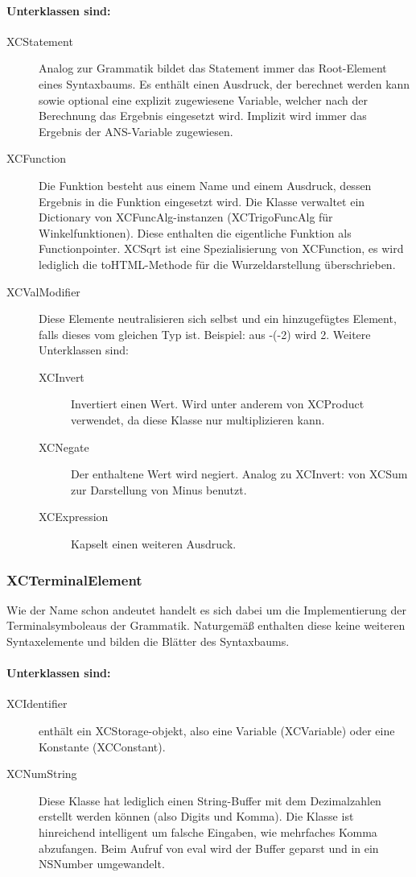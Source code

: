 \paragraph{Unterklassen sind:} 
\begin{description}
	\item[XCStatement]
		Analog zur Grammatik bildet das Statement immer das Root-Element eines Syntaxbaums. Es enthält einen Ausdruck, der berechnet werden kann sowie optional eine explizit zugewiesene Variable, welcher nach der Berechnung das Ergebnis eingesetzt wird. Implizit wird immer das Ergebnis der ANS-Variable zugewiesen. 
	\item[XCFunction] Die Funktion besteht aus einem Name und einem Ausdruck, dessen Ergebnis in die Funktion eingesetzt wird. Die Klasse verwaltet ein Dictionary von XCFuncAlg-instanzen (XCTrigoFuncAlg für Winkelfunktionen). Diese enthalten die eigentliche Funktion als Functionpointer.
		XCSqrt ist eine Spezialisierung von XCFunction, es wird lediglich die toHTML-Methode für die Wurzeldarstellung überschrieben.
	\item[XCValModifier] Diese Elemente neutralisieren sich selbst und ein hinzugefügtes Element, falls dieses vom gleichen Typ ist.
		Beispiel: aus -(-2) wird 2.
		Weitere Unterklassen sind:
		\begin{description}
			\item[XCInvert]
				Invertiert einen Wert. Wird unter anderem von XCProduct verwendet, da diese Klasse nur multiplizieren kann.
			\item[XCNegate] Der enthaltene Wert wird negiert. Analog zu XCInvert: von XCSum zur 
				Darstellung von Minus benutzt.
			\item[XCExpression] Kapselt einen weiteren Ausdruck.
		\end{description}
\end{description}
\subsubsection{XCTerminalElement}
Wie der Name schon andeutet handelt es sich dabei um die Implementierung der Terminalsymboleaus der Grammatik. Naturgemäß enthalten diese keine weiteren Syntaxelemente und bilden die Blätter des Syntaxbaums.

\paragraph{Unterklassen sind:} 
\begin{description}
	\item[XCIdentifier] enthält ein XCStorage-objekt, also eine Variable (XCVariable) oder eine Konstante (XCConstant).
	\item[XCNumString] Diese Klasse hat lediglich einen String-Buffer mit dem Dezimalzahlen erstellt werden können (also Digits und Komma). Die Klasse ist hinreichend intelligent um falsche Eingaben, wie mehrfaches Komma abzufangen.
		Beim Aufruf von eval wird der Buffer geparst und in ein NSNumber umgewandelt.
\end{description}


